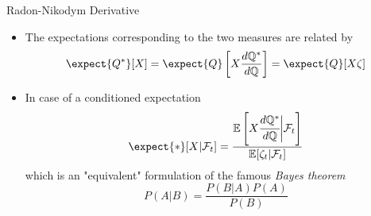 \documentclass{beamer}
\begin{document}
\begin{frame}{Radon-Nikodym Derivative}
  \begin{itemize}
  \item The expectations corresponding to the two measures are related by
    \begin{equation*}
      \expect{Q^*}[X] = \expect{Q}\left[X\frac{d\mathbb{Q}^*}{d\mathbb{Q}}\right]= \expect{Q}[X\zeta]
    \end{equation*}
	\pause
  \item In case of a conditioned expectation
    \begin{equation}
      \expect{*}[X|\mathcal{F}_t] = \frac{\mathbb{E}\left[X\cfrac{d\mathbb{Q}^*}{d\mathbb{Q}}\bigg|\mathcal{F}_t\right]}{\mathbb{E}[\zeta_t|\mathcal{F}_t]}
      \label{eq:conditioned_expectation}
    \end{equation}
    which is an "equivalent" formulation of the famous \emph{Bayes theorem}
    \begin{equation*}
      P(A|B)=\frac{P(B|A)P(A)}{P(B)}
    \end{equation*}
  \end{itemize}
\end{frame}

\end{document}
